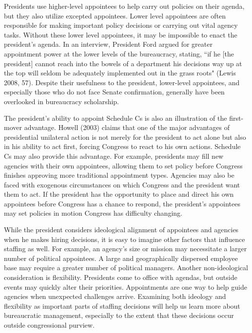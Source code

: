 \documentclass[12pt]{article}
\begin{document}
Presidents use higher-level appointees to help carry out policies on their agenda, but they also utilize excepted appointees. Lower level appointees are often responsible for making important policy decisions or carrying out vital agency tasks. Without these lower level appointees, it may be impossible to enact the president's agenda. In an interview, President Ford argued for greater appointment power at the lower levels of the bureaucracy, stating, ``if he [the president] cannot reach into the bowels of a department his decisions way up at the top will seldom be adequately implemented out in the grass roots" (Lewis 2008, 57). Despite their usefulness to the president, lower-level appointees, and especially those who do not face Senate confirmation, generally have been overlooked in bureaucracy scholarship.

The president's ability to appoint Schedule Cs is also an illustration of the first-mover advantage. Howell (2003) claims that one of the major advantages of presidential unilateral action is not merely for the president to act alone but also in his ability to act first, forcing Congress to react to his own actions. Schedule Cs may also provide this advantage. For example, presidents may fill new agencies with their own appointees, allowing them to set policy before Congress finishes approving more traditional appointment types. Agencies may also be faced with exogenous circumstances on which Congress and the president want them to act. If the president has the opportunity to place and direct his own appointees before Congress has a chance to respond, the president's appointees may set policies in motion Congress has difficulty changing.
	
While the president considers ideological alignment of appointees and agencies when he makes hiring decisions, it is easy to imagine other factors that influence staffing as well. For example, an agency's size or mission may necessitate a larger number of political appointees. A large and geographically dispersed employee base may require a greater number of political managers. Another non-ideological consideration is flexibility. Presidents come to office with agendas, but outside events may quickly alter their priorities. Appointments are one way to help guide agencies when unexpected challenges arrive. Examining both ideology and flexibility as important parts of staffing decisions will help us learn more about bureaucratic management, especially to the extent that these decisions occur outside congressional purview. 
	
\end{document}
